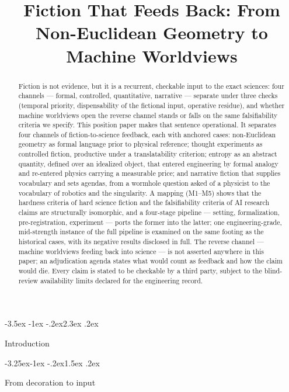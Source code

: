 \documentclass[11pt,a4paper]{article}
\title{Fiction That Feeds Back: From Non-Euclidean Geometry to Machine Worldviews}
\author{}
\date{}
\makeatletter
\renewcommand\section{\@startsection{section}{1}{\z@}%
  {-3.5ex \@plus -1ex \@minus -.2ex}{2.3ex \@plus .2ex}%
  {\normalfont\Large\bfseries\raggedright}}
\renewcommand\subsection{\@startsection{subsection}{2}{\z@}%
  {-3.25ex\@plus -1ex \@minus -.2ex}{1.5ex \@plus .2ex}%
  {\normalfont\large\bfseries\raggedright}}
\makeatother
\begin{document}
\maketitle
\thispagestyle{empty}

\begin{abstract}


Fiction is not evidence, but it is a recurrent, checkable input to the exact sciences: four channels — formal, controlled, quantitative, narrative — separate under three checks (temporal priority, dispensability of the fictional input, operative residue), and whether machine worldviews open the reverse channel stands or falls on the same falsifiability criteria we specify. This position paper makes that sentence operational. It separates four channels of fiction-to-science feedback, each with anchored cases: non-Euclidean geometry as formal language prior to physical reference; thought experiments as controlled fiction, productive under a translatability criterion; entropy as an abstract quantity, defined over an idealized object, that entered engineering by formal analogy and re-entered physics carrying a measurable price; and narrative fiction that supplies vocabulary and sets agendas, from a wormhole question asked of a physicist to the vocabulary of robotics and the singularity. A mapping (M1–M5) shows that the hardness criteria of hard science fiction and the falsifiability criteria of AI research claims are structurally isomorphic, and a four-stage pipeline — setting, formalization, pre-registration, experiment — ports the former into the latter; one engineering-grade, mid-strength instance of the full pipeline is examined on the same footing as the historical cases, with its negative results disclosed in full. The reverse channel — machine worldviews feeding back into science — is not asserted anywhere in this paper; an adjudication agenda states what would count as feedback and how the claim would die. Every claim is stated to be checkable by a third party, subject to the blind-review availability limits declared for the engineering record.

\end{abstract}

\section{Introduction}

\subsection{From decoration to input}
\end{document}
